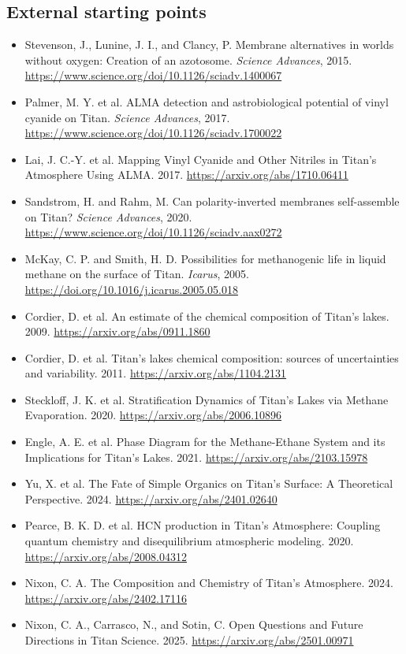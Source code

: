 \documentclass[11pt]{article}
\begin{document}
\subsection*{External starting points}

\begin{itemize}
\item Stevenson, J., Lunine, J. I., and Clancy, P. Membrane alternatives in worlds without oxygen: Creation of an azotosome. \textit{Science Advances}, 2015. \url{https://www.science.org/doi/10.1126/sciadv.1400067}
\item Palmer, M. Y. et al. ALMA detection and astrobiological potential of vinyl cyanide on Titan. \textit{Science Advances}, 2017. \url{https://www.science.org/doi/10.1126/sciadv.1700022}
\item Lai, J. C.-Y. et al. Mapping Vinyl Cyanide and Other Nitriles in Titan's Atmosphere Using ALMA. 2017. \url{https://arxiv.org/abs/1710.06411}
\item Sandstrom, H. and Rahm, M. Can polarity-inverted membranes self-assemble on Titan? \textit{Science Advances}, 2020. \url{https://www.science.org/doi/10.1126/sciadv.aax0272}
\item McKay, C. P. and Smith, H. D. Possibilities for methanogenic life in liquid methane on the surface of Titan. \textit{Icarus}, 2005. \url{https://doi.org/10.1016/j.icarus.2005.05.018}
\item Cordier, D. et al. An estimate of the chemical composition of Titan's lakes. 2009. \url{https://arxiv.org/abs/0911.1860}
\item Cordier, D. et al. Titan's lakes chemical composition: sources of uncertainties and variability. 2011. \url{https://arxiv.org/abs/1104.2131}
\item Steckloff, J. K. et al. Stratification Dynamics of Titan's Lakes via Methane Evaporation. 2020. \url{https://arxiv.org/abs/2006.10896}
\item Engle, A. E. et al. Phase Diagram for the Methane-Ethane System and its Implications for Titan's Lakes. 2021. \url{https://arxiv.org/abs/2103.15978}
\item Yu, X. et al. The Fate of Simple Organics on Titan's Surface: A Theoretical Perspective. 2024. \url{https://arxiv.org/abs/2401.02640}
\item Pearce, B. K. D. et al. HCN production in Titan's Atmosphere: Coupling quantum chemistry and disequilibrium atmospheric modeling. 2020. \url{https://arxiv.org/abs/2008.04312}
\item Nixon, C. A. The Composition and Chemistry of Titan's Atmosphere. 2024. \url{https://arxiv.org/abs/2402.17116}
\item Nixon, C. A., Carrasco, N., and Sotin, C. Open Questions and Future Directions in Titan Science. 2025. \url{https://arxiv.org/abs/2501.00971}
\end{itemize}
\end{document}
